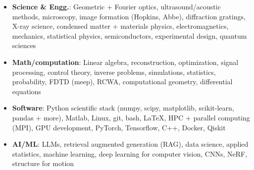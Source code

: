 \begin{itemize}
    \item \textbf{Science \& Engg.}: Geometric + Fourier optics, ultrasound/acoustic methods, microscopy, image formation (Hopkins, Abbe), diffraction gratings, X-ray science, condensed matter + materials physics, electromagnetics, mechanics, statistical physics, semiconductors, experimental design, quantum sciences \par
    \item \textbf{Math/computation}: Linear algebra, reconstruction, optimization, signal processing, control theory, inverse problems, simulations, statistics, probability, FDTD (meep), RCWA, computational geometry, differential equations \par
    \item \textbf{Software}: Python scientific stack (numpy, scipy, matplotlib, scikit-learn, pandas + more), Matlab, Linux, git, bash, \LaTeX, HPC + parallel computing (MPI), GPU development, PyTorch, Tensorflow, C++, Docker, Qiskit \par
    \item\textbf{AI/ML}: LLMs, retrieval augmented generation (RAG), data science, applied statistics, machine learning, deep learning for computer vision, CNNs, NeRF, structure for motion \par
\end{itemize}
